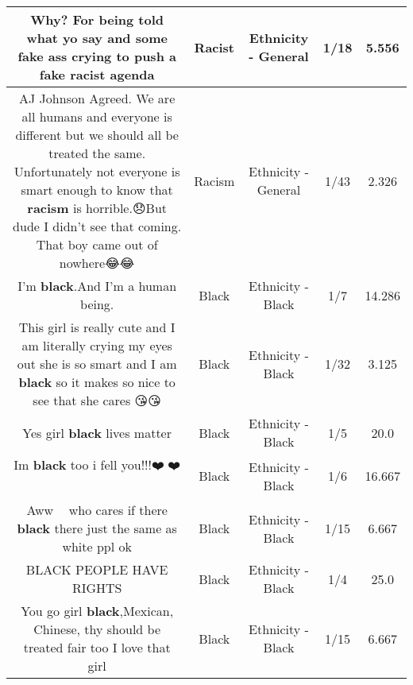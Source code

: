 \documentclass[11pt]{article}
\newlength\mylength
\begin{document}
\begin{center}
\begin{longtable}{|C{.65\mylength}|C{.30\mylength}|C{.12\mylength}|C{.12\mylength}|C{.12\mylength}|}
  \small Why? For being told what yo say and some fake ass crying to push a fake \textbf{racist} agenda\normalsize   & Racist & Ethnicity - General & 1/18 & 5.556 \\  \hline
  \small AJ Johnson Agreed. We are all humans and everyone is different but we should all be treated the same. Unfortunately not everyone is smart enough to know that \textbf{racism} is horrible.😞But dude I didn't see that coming. That boy came out of nowhere😂😂\normalsize   & Racism & Ethnicity - General & 1/43 & 2.326 \\  \hline
  \small I'm \textbf{black}.And I'm a human being.\normalsize   & Black & Ethnicity - Black & 1/7 & 14.286 \\  \hline
  \small This girl is really cute and I am literally crying my eyes out she is so smart and I am \textbf{black} so it makes so nice to see that she cares 😘😘\normalsize   & Black & Ethnicity - Black & 1/32 & 3.125 \\  \hline
  \small Yes girl \textbf{black} lives matter\normalsize   & Black & Ethnicity - Black & 1/5 & 20.0 \\  \hline
  \small Im \textbf{black} too i fell you!!!❤️💖❤️🎉🎉🎉🎉🙏🙏🙏👩🏾‍🦱👩🏾‍🦱👩🏾‍🦱👩🏾‍🦱👩🏾‍🦱👩🏾‍🦱👩🏾‍🦱👩🏾‍🦱👩🏾‍🦱\normalsize   & Black & Ethnicity - Black & 1/6 & 16.667 \\  \hline
  \small Aww 😤😢 who cares if there \textbf{black} there just the same as white ppl ok\normalsize   & Black & Ethnicity - Black & 1/15 & 6.667 \\  \hline
  \small BLACK PEOPLE HAVE RIGHTS\normalsize   & Black & Ethnicity - Black & 1/4 & 25.0 \\  \hline
  \small You go girl \textbf{black},Mexican, Chinese, thy should be treated fair too I love that girl\normalsize   & Black & Ethnicity - Black & 1/15 & 6.667 \\  \hline

\end{longtable}
\end{center}
\end{document}
